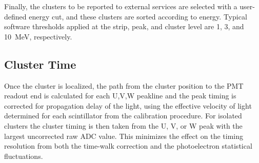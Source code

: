 Finally, the clusters to be reported to external services are selected with a user-defined energy cut, and these
clusters are sorted according to energy. Typical software thresholds applied at the strip, peak, and cluster level
are 1, 3, and 10~MeV, respectively. 

\subsection {Cluster Time}

Once the cluster is localized, the path from the cluster position to the PMT readout end is calculated for each
U,V,W peakline and the peak timing is corrected for propagation delay of the light, using the effective velocity of
light determined for each scintillator from the calibration procedure. For isolated clusters the cluster timing is
then taken from the U, V, or W peak with the largest uncorrected raw ADC value. This minimizes the effect on the
timing resolution from both the time-walk correction and the photoelectron statistical fluctuations.

